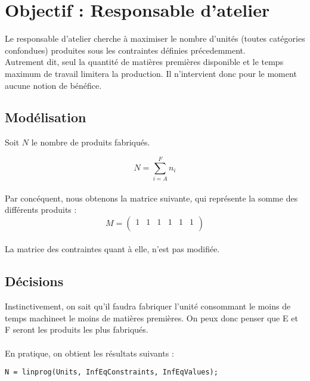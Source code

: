 \newpage
\section{Objectif : Responsable d'atelier}
Le responsable d'atelier cherche à maximiser le nombre d'unités (toutes
catégories confondues) produites sous les contraintes définies précedemment.\\
Autrement dit, seul la quantité de matières premières disponible et le temps
maximum de travail limitera la production. Il n'intervient donc pour le moment
aucune notion de bénéfice.

\subsection{Modélisation}
Soit $N$ le nombre de produits fabriqués.

\begin{equation}
	N = \sum_{i = A}^{F} n_i
\end{equation} 
~\\
Par concéquent, nous obtenons la matrice suivante, qui représente la somme des
différents produits :  
\begin{displaymath}
M = \left(
\begin{array}{cccccc}
1 & 1 & 1 & 1 & 1 & 1\\
\end{array}
\right)
\end{displaymath}
~\\
La matrice des contraintes quant à elle, n'est pas modifiée.

\subsection{Décisions}
Instinctivement, on sait qu'il faudra fabriquer l'unité consommant le moins de
\og temps machine\fg et le moins de matières premières. On peux donc penser que
E et F seront les produits les plus fabriqués.\\
~\\
En pratique, on obtient les résultats suivants :\\

\begin{lstlisting}
N = linprog(Units, InfEqConstraints, InfEqValues);
\end{lstlisting}

